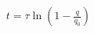 \documentclass[preview]{standalone}
\begin{document}
\begin{align*}
t = \tau \ln\left(1 - \frac{q}{q_{0}}\right)
\end{align*}
\end{document}
